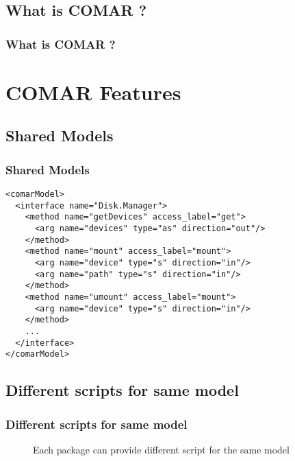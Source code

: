 \documentclass{beamer}
\begin{document}
\subsection{What is COMAR ?}
\frame
{
    \frametitle{What is COMAR ?}
}

\section{COMAR Features}

\subsection{Shared Models}
\begin{frame}[fragile]
    \frametitle{Shared Models}
    \scriptsize
    \begin{verbatim}
<comarModel>
  <interface name="Disk.Manager">
    <method name="getDevices" access_label="get">
      <arg name="devices" type="as" direction="out"/>
    </method>
    <method name="mount" access_label="mount">
      <arg name="device" type="s" direction="in"/>
      <arg name="path" type="s" direction="in"/>
    </method>
    <method name="umount" access_label="mount">
      <arg name="device" type="s" direction="in"/>
    </method>
    ...
  </interface>
</comarModel>
    \end{verbatim}
\end{frame}

\subsection{Different scripts for same model}
\begin{frame}[fragile]
    \frametitle{Different scripts for same model}
    \begin{figure}
     Each package can provide different script for the same model
     \begin{center}{}\end{center}
    \end{figure}
\end{frame}
\end{document}
